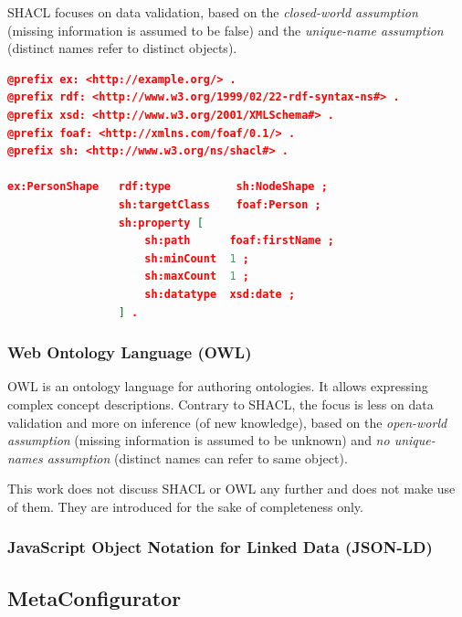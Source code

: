 SHACL focuses on data validation, based on the \textit{closed-world assumption} (missing information is assumed to be false) and the \textit{unique-name assumption} (distinct names refer to distinct objects).\cite{steffen_staab_lecture_slides}

\begin{lstlisting}[language=json,basicstyle=\scriptsize,firstnumber=1,caption={SHACL example shape},captionpos=b,label={lst:shacl_example}]
@prefix ex: <http://example.org/> .
@prefix rdf: <http://www.w3.org/1999/02/22-rdf-syntax-ns#> .
@prefix xsd: <http://www.w3.org/2001/XMLSchema#> .
@prefix foaf: <http://xmlns.com/foaf/0.1/> .
@prefix sh: <http://www.w3.org/ns/shacl#> .

ex:PersonShape   rdf:type          sh:NodeShape ;
                 sh:targetClass    foaf:Person ;
                 sh:property [
                     sh:path      foaf:firstName ;
                     sh:minCount  1 ;
                     sh:maxCount  1 ;
                     sh:datatype  xsd:date ;
                 ] .
\end{lstlisting}



\subsubsection{Web Ontology Language (OWL)}
OWL \cite{OWL} is an ontology language for authoring ontologies.
It allows expressing complex concept descriptions.
Contrary to SHACL, the focus is less on data validation and more on inference (of new knowledge), based on the \textit{open-world assumption} (missing information is assumed to be unknown) and \textit{no unique-names assumption} (distinct names can refer to same object).\cite{steffen_staab_lecture_slides}

This work does not discuss SHACL or OWL any further and does not make use of them. 
They are introduced for the sake of completeness only.



\subsubsection{JavaScript Object Notation for Linked Data (JSON-LD)}



\subsection{MetaConfigurator}